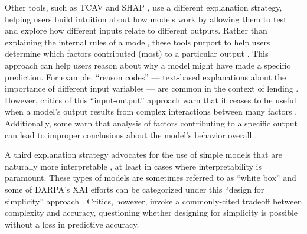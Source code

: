 Other tools, such as TCAV \cite{KimTCAV2018} and SHAP \cite{LundbergLeeSHAP2017}, use a different explanation strategy, helping users build intuition about how models work by allowing them to test and explore how different inputs relate to different outputs. Rather than explaining the internal rules of a model, these tools purport to help users determine which factors contributed (most) to a particular output \cite{SelbstBarocasIntuitive2018}. This approach can help users reason about why a model might have made a specific prediction. For example, “reason codes” — text-based explanations about the importance of different input variables — are common in the context of lending \cite{SelbstBarocasIntuitive2018}. However, critics of this “input-output” approach warn that it ceases to be useful when a model’s output results from complex interactions between many factors \cite{SelbstBarocasIntuitive2018}. Additionally, some warn that analysis of factors contributing to a specific output can lead to improper conclusions about the model’s behavior overall \cite{DoshiVelezAccountability2017}. 

A third explanation strategy advocates for the use of simple models that are naturally more interpretable \cite{rudin2018stop}, at least in cases where interpretability is paramount. These types of models are sometimes referred to as “white box” and some of DARPA’s XAI efforts can be categorized under this “design for simplicity” approach \cite{DARPAXAI}. Critics, however, invoke a commonly-cited tradeoff between complexity and accuracy, questioning whether designing for simplicity is possible without a loss in predictive accuracy.




